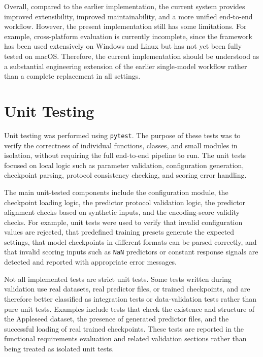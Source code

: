 \documentclass[12pt, titlepage]{article}
\begin{document}
Overall, compared to the earlier implementation, the current system provides improved extensibility, improved maintainability, and a more unified end-to-end workflow.
However, the present implementation still has some limitations.
For example, cross-platform evaluation is currently incomplete, since the framework has been used extensively on Windows and Linux but has not yet been fully tested on macOS.
Therefore, the current implementation should be understood as a substantial engineering extension of the earlier single-model workflow rather than a complete replacement in all settings.



\section{Unit Testing}

Unit testing was performed using \texttt{pytest}.
The purpose of these tests was to verify the correctness of individual functions, classes, and small modules in isolation, without requiring the full end-to-end pipeline to run.
The unit tests focused on local logic such as parameter validation, configuration generation, checkpoint parsing, protocol consistency checking, and scoring error handling.

The main unit-tested components include the configuration module, the checkpoint loading logic, the predictor protocol validation logic, the predictor alignment checks based on synthetic inputs, and the encoding-score validity checks.
For example, unit tests were used to verify that invalid configuration values are rejected, that predefined training presets generate the expected settings, that model checkpoints in different formats can be parsed correctly, and that invalid scoring inputs such as \texttt{NaN} predictors or constant response signals are detected and reported with appropriate error messages.

Not all implemented tests are strict unit tests.
Some tests written during validation use real datasets, real predictor files, or trained checkpoints, and are therefore better classified as integration tests or data-validation tests rather than pure unit tests.
Examples include tests that check the existence and structure of the Appleseed dataset, the presence of generated predictor files, and the successful loading of real trained checkpoints.
These tests are reported in the functional requirements evaluation and related validation sections rather than being treated as isolated unit tests.
\end{document}
